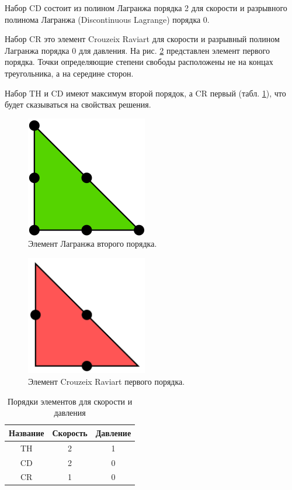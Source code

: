 \documentclass[12pt]{article}
\begin{document}
Набор CD состоит из полином Лагранжа порядка 2 для скорости и разрывного полинома Лагранжа (Discontinuous Lagrange) порядка 0.

Набор CR это элемент Crouzeix Raviart для скорости и разрывный полином Лагранжа порядка 0 для давления. На рис. \ref{fg:crouzeix1} представлен элемент первого порядка. Точки определяющие степени свободы расположены не на концах треугольника, а на середине сторон.

Набор TH и CD имеют максимум второй порядок, а CR первый (табл. \ref{tb:order}), что будет сказываться на свойствах решения.

\begin{figure}
	\begin{center}
		\includegraphics[width=200px]{pics/lagrange2}
		\caption{Элемент Лагранжа второго порядка.}
		\label{fg:lagrange2}
	\end{center}
\end{figure}

\begin{figure}
	\begin{center}
		\includegraphics[width=200px]{pics/crouzeix1}
		\caption{Элемент Crouzeix Raviart первого порядка.}
		\label{fg:crouzeix1}
	\end{center}
\end{figure}

\begin{table}
\begin{center}
\begin{tabular}{|c|c|c|}
\hline
Название & Скорость & Давление \\
\hline
TH & 2 & 1 \\
\hline
CD & 2 & 0 \\
\hline
CR & 1 & 0 \\
\hline
\end{tabular}
\end{center}
\caption{Порядки элементов для скорости и давления}
\label{tb:order}
\end{table}
\end{document}
